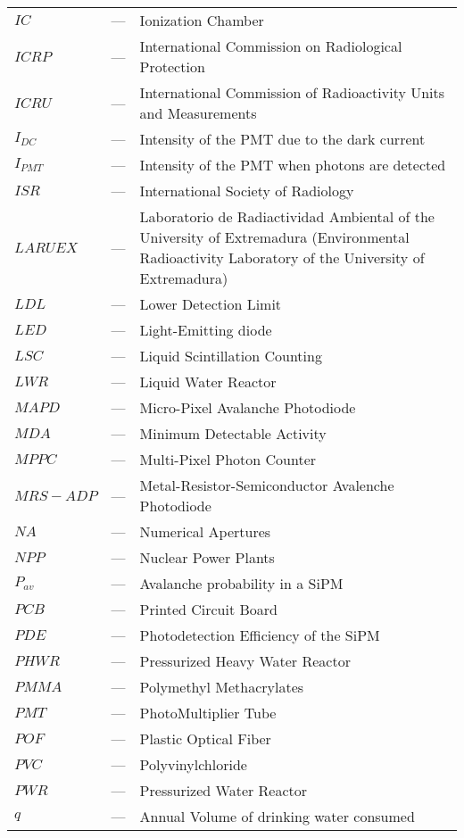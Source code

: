 \begin{longtable}{p{25mm} c p{120mm} }
$IC$ & --- & Ionization Chamber\\
$ICRP$ & --- & International Commission on Radiological Protection \\
$ICRU$ & --- & International Commission of Radioactivity Units 
\newline
and Measurements\\
$I_{DC}$ & --- & Intensity of the PMT due to the dark current\\
$I_{PMT}$ & --- & Intensity of the PMT when photons are detected\\
$ISR$ & --- & International Society of Radiology \\
$LARUEX$ & --- & Laboratorio de Radiactividad Ambiental of the University
\newline
of Extremadura (Environmental Radioactivity Laboratory
\newline
of the University of Extremadura)\\
$LDL$ & --- & Lower Detection Limit\\
$LED$ & --- & Light-Emitting diode \\
$LSC$ & --- & Liquid Scintillation Counting\\
$LWR$ & --- & Liquid Water Reactor\\
$MAPD$ & --- & Micro-Pixel Avalanche Photodiode\\
$MDA$ & --- & Minimum Detectable Activity\\
$MPPC$ & --- & Multi-Pixel Photon Counter\\
$MRS-ADP$ & --- & Metal-Resistor-Semiconductor Avalenche Photodiode\\
$NA$ & --- & Numerical Apertures\\
$NPP$ & --- & Nuclear Power Plants\\
$P_{av}$ & --- & Avalanche probability in a SiPM\\
$PCB$ & --- & Printed Circuit Board\\
$PDE$ & --- & Photodetection Efficiency of the SiPM\\
$PHWR$ & --- & Pressurized Heavy Water Reactor\\
$PMMA$ & --- & Polymethyl Methacrylates\\
$PMT$ & --- & PhotoMultiplier Tube\\
$POF$ & --- & Plastic Optical Fiber\\
$PVC$ & --- & Polyvinylchloride\\
$PWR$ & --- & Pressurized Water Reactor\\
$q$ & --- & Annual Volume of drinking water consumed\\

\end{longtable}
